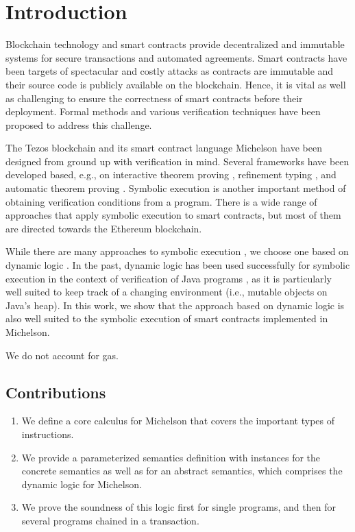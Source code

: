 \section{Introduction}
\label{sec:introduction}

Blockchain technology and smart contracts provide decentralized and
immutable systems for secure transactions and automated agreements.
Smart contracts have been targets of spectacular and costly attacks as
contracts are immutable and their source code is publicly available on
the blockchain. 
Hence, it is vital as well as challenging to ensure the correctness of smart contracts
before their deployment. Formal methods and various verification
techniques have been proposed to address this challenge.

The Tezos blockchain \cite{tezos-whitepaper} and its smart contract
language Michelson have been designed from
ground up with verification in mind. Several frameworks have been
developed based, e.g., on interactive theorem proving \cite{micho},
refinement typing \cite{helmholtz-from-thesis}, and automatic theorem
proving \cite{WHYtool}. 
Symbolic execution is another important method of obtaining verification
conditions from a program. There is a wide range of approaches that
apply symbolic execution to smart contracts, but most of them are
directed towards the Ethereum blockchain.

While there are many approaches to symbolic execution \cite{...}, we
choose one based on dynamic logic \cite{DL}. In the past, dynamic
logic has been used successfully for symbolic execution in the context
of verification of Java programs \cite{KeY3}, as it is particularly
well suited to keep track of a changing environment (i.e., mutable
objects on Java's heap). 
In this work, we show that the approach based on dynamic logic is also
well suited to the symbolic execution of smart contracts implemented
in Michelson.

We do not account for gas.

\subsection*{Contributions}
\label{sec:contributions}

\begin{enumerate}
\item We define a core calculus for Michelson that covers
  the important types of instructions.
\item We provide a parameterized semantics definition with instances
  for the concrete semantics as well as for an abstract semantics,
  which comprises the dynamic logic for Michelson. 
\item We prove the soundness of this logic first for single programs,
  and then for several programs chained in a transaction.
\end{enumerate}

